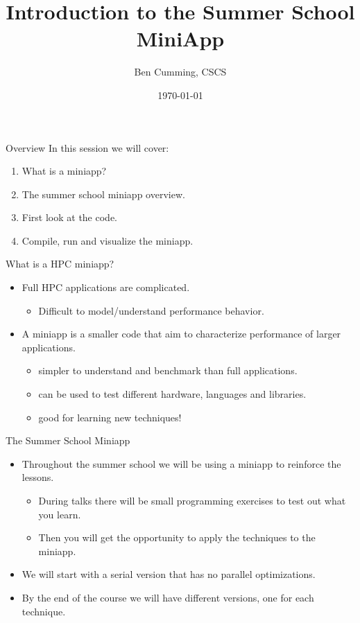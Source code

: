 \documentclass[aspectratio=43]{beamer}
\author{Ben Cumming, CSCS}
\title{Introduction to the Summer School MiniApp}
\subtitle{}
\date{\today}
\begin{document}
\cscstitle

\begin{frame}[fragile]{Overview}
    In this session we will cover:
    \begin{enumerate}
        \item What is a miniapp?
        \item The summer school miniapp overview.
        \item First look at the code.
        \item Compile, run and visualize the miniapp.
    \end{enumerate}
\end{frame}

\begin{frame}[fragile]{What is a HPC miniapp?}
    \begin{itemize}
        \item Full HPC applications are complicated.
        \begin{itemize}
            \item Difficult to model/understand performance behavior.
        \end{itemize}
        \item A miniapp is a smaller code that aim to characterize performance of larger applications.
        \begin{itemize}
            \item simpler to understand and benchmark than full applications.
            \item can be used to test different hardware, languages and libraries.
            \item good for learning new techniques!
        \end{itemize}
    \end{itemize}
\end{frame}

\begin{frame}[fragile]{The Summer School Miniapp}
    \begin{itemize}
        \item Throughout the summer school we will be using a  miniapp to reinforce the lessons.
        \begin{itemize}
            \item During talks there will be small programming exercises to  test out what you learn.
            \item Then you will get the opportunity to apply the techniques  to the miniapp.
        \end{itemize}
        \item We will start with a serial version that has no parallel  optimizations.
        \item By the end of the course we will have different  versions, one for each technique.
    \end{itemize}
\end{frame}
\end{document}
